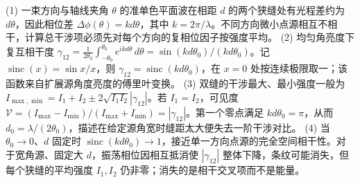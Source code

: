 (1) 一束方向与轴线夹角 \(\theta\) 的准单色平面波在相距 \(d\) 的两个狭缝处有光程差约为 \(d\theta\)，因此相位差 \(\Delta\phi(\theta)=kd\theta\)，其中 \(k=2\pi/\lambda\)。不同方向微小点源相互不相干，计算总干涉项必须先对每个方向的复相位因子按强度平均。
(2) 均匀角亮度下复互相干度 \(\gamma_{12}=\frac1{2\theta_0}\int_{-\theta_0}^{\theta_0}e^{ikd\theta}\,d\theta=\sin(kd\theta_0)/(kd\theta_0)\)。记 \(\operatorname{sinc}(x)=\sin x/x\)，则 \(\gamma_{12}=\operatorname{sinc}(kd\theta_0)\)，在 \(x=0\) 处按连续极限取一；该函数来自扩展源角度亮度的傅里叶变换。
(3) 双缝的干涉最大、最小强度一般为 \(I_{\max,\min}=I_1+I_2\pm2\sqrt{I_1I_2}|\gamma_{12}|\)。若 \(I_1=I_2\)，可见度 \(\mathcal V=(I_{\max}-I_{\min})/(I_{\max}+I_{\min})=|\gamma_{12}|\)。第一个零点满足 \(kd\theta_0=\pi\)，从而 \(d_0=\lambda/(2\theta_0)\)，描述在给定源角宽时缝距太大便失去一阶干涉对比。
(4) 当 \(\theta_0\to0\)、\(d\) 固定时 \(\operatorname{sinc}(kd\theta_0)\to1\)，接近单一方向点源的完全空间相干性。对于宽角源、固定大 \(d\)，振荡相位因相互抵消使 \(|\gamma_{12}|\) 整体下降，条纹可能消失，但每个狭缝的平均强度 \(I_1,I_2\) 仍非零；消失的是相干交叉项而不是能量。
